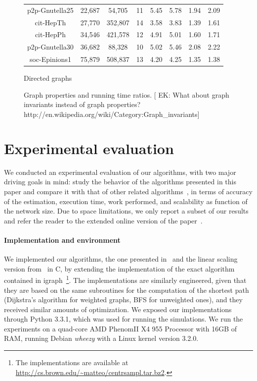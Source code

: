 \begin{figure}
\begin{subtable}{\textwidth}
\begin{small}
\begin{tabular}{cccccccc}
      p2p-Gnutella25 & 22,687 & 54,705 & 11 & 5.45 & 5.78 & 1.94 & 2.09 \\
      cit-HepTh & 27,770 & 352,807 & 14 & 3.58 & 3.83 & 1.39 & 1.61 \\
      cit-HepPh & 34,546 & 421,578 & 12 & 4.91 & 5.01 & 1.60 & 1.71 \\ 
      p2p-Gnutella30 & 36,682 & 88,328 & 10 & 5.02 & 5.46 & 2.08 & 2.22\\
      soc-Epinions1 & 75,879 & 508,837 & 13 & 4.20 & 4.25 & 1.35 & 1.38\\
      \bottomrule
    \end{tabular} 
  \end{small}
  \ifdmkd
  \else
  \caption{Directed graphs}
  \label{tab:expDir}
  \fi
  \end{subtable}
  \caption{Graph properties and running time ratios. [ EK: What about graph invariants instead of graph properties? http://en.wikipedia.org/wiki/Category:Graph_invariants]}
  \label{fig:tables}
\end{figure}

\section{Experimental evaluation}\label{sec:exper}
We conducted an experimental evaluation of our algorithms, with two major
driving goals in mind: study the behavior of the algorithms presented in this
paper and compare it with that of other related
algorithms~\citep{Brandes01,BrandesP07,JacobKLPT05,GeisbergerSS08}, in terms of
accuracy of the estimation, execution time, work performed, and scalability as
function of the network size.
\ifproof 
\else
Due to space limitations, we only report a subset
of our results and refer the reader to the extended online version of the
paper~\citep{RiondatoK13}.
\fi

\paragraph{Implementation and environment}
We implemented our algorithms, the one presented in~\citep{BrandesP07,JacobKLPT05}
and the linear scaling version from~\citep{GeisbergerSS08} in C, by extending
the implementation of the exact algorithm~\citep{Brandes01} contained in
igraph~\citep{igraph}\footnote{The implementations are available at
\url{http://cs.brown.edu/~matteo/centrsampl.tar.bz2}.}. The implementations are similarly engineered, given that
they are based on the same subroutines for the computation of the shortest path
(Dijkstra's algorithm for weighted graphs, BFS for unweighted ones), and they
received similar amounts of optimization. We exposed our implementations through
Python 3.3.1, which was used for running the simulations. We run the experiments
on a quad-core AMD Phenom\texttrademark II X4 955 Processor with 16GB of RAM,
running Debian \emph{wheezy} with a Linux kernel version 3.2.0.

